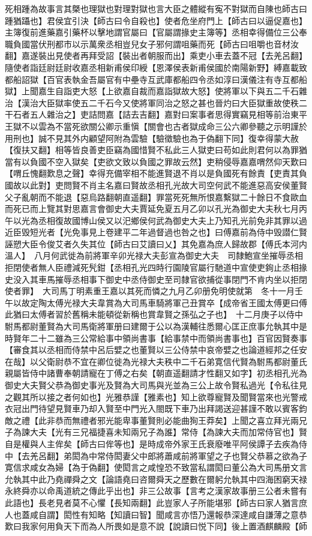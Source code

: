 死相踵為故事言其槩也理獄也對理對獄也言大臣之體縱有寃不對獄而自陳也師古曰踵猶躡也】君侯宜引決【師古曰令自殺也】使者危坐府門上【師古曰以逼促嘉也】主簿復前進藥嘉引藥杯以擊地謂官屬曰【官屬謂掾史主簿等】丞相幸得備位三公奉職負國當伏刑都市以示萬衆丞相豈兒女子邪何謂咀藥而死【師古曰咀嚼也音材汝翻】嘉遂裝出見使者再拜受詔【裝出者朝服而出】乘吏小車去蓋不冠【去羌呂翻】隨使者詣廷尉廷尉收嘉丞相新甫侯印綬【恩澤侯表新甫侯國於南陽新野】縛嘉載致都船詔獄【百官表執金吾屬官有中壘寺互武庫都船四令丞如淳曰漢儀注有寺互都船獄】上聞嘉生自詣吏大怒【上欲嘉自裁而嘉詣獄故大怒】使將軍以下與五二千石雜治【漢治大臣獄率使五二千石今又使將軍同治之怒之甚也晉灼曰大臣獄重故使秩二干石者五人雜治之】吏詰問嘉【詰去吉翻】嘉對曰案事者思得實竊見相等前治東平王獄不以雲為不當死欲關公卿示重愼【關會也古者獄成命三公六卿參聽之示明謹於用刑也】誠不見其外内顧望阿附為雲驗【驗徵驗也為于偽翻下同】復幸得蒙大赦【復扶又翻】相等皆良善吏臣竊為國惜賢不私此三人獄吏曰苟如此則君何以為罪猶當有以負國不空入獄矣【吏欲文致以負國之罪故云然】吏稍侵辱嘉嘉喟然仰天歎曰【喟丘愧翻歎息之聲】幸得充備宰相不能進賢退不肖以是負國死有餘責【吏責其負國故以此對】吏問賢不肖主名嘉曰賢故丞相孔光故大司空何武不能進惡高安侯董賢父子亂朝而不能退【惡烏路翻朝直遥翻】罪當死死無所恨嘉繫獄二十餘日不食歐血而死已而上覽其對思嘉言會御史大夫賈延免夏五月乙卯以孔光為御史大夫秋七月丙午以光為丞相復故國博山侯又以汜鄉侯何武為御史大夫上乃知孔光前免非其罪以過近臣毁短光者【光免事見上卷建平二年過督過也咎之也】曰傅嘉前為侍中毁譛仁賢誣愬大臣令俊艾者久失其位【師古曰艾讀曰乂】其免嘉為庶人歸故郡【傅氏本河内溫人】　八月何武徙為前將軍辛卯光禄大夫彭宣為御史大夫　司隸鮑宣坐摧辱丞相拒閉使者無人臣禮減死髠鉗【丞相孔光四時行園陵官屬行馳道中宣使吏銁止丞相掾史没入其車馬摧辱丞相事下御史中丞侍御史至司隸官欲捕從事閉門不肯内坐以拒閉使者罪】　大司馬丁明素重王嘉以其死而憐之九月乙卯册免明使就第　冬十一月壬午以故定陶太傅光禄大夫韋賞為大司馬車騎將軍己丑賞卒【成帝省王國太傅更曰傅此猶曰太傅者習於舊稱未能頓從新稱也賞韋賢之孫弘之子也】　十二月庚子以侍中駙馬都尉董賢為大司馬衛將軍册曰建爾于公以為漢輔往悉爾心匡正庶事允執其中是時賢年二十二雖為三公常給事中領尚書事【給事禁中而領尚書事也】百官因賢奏事【審食其以丞相而侍禁中呂后嬖之也董賢以三公侍禁中哀帝嬖之也論道經邦之任安在哉】以父衛尉恭不宜在卿位徙為光禄大夫秩中二千石弟寛信代賢為駙馬都尉董氏親屬皆侍中諸曹奉朝請寵在丁傅之右矣【朝直遥翻請才性翻又如字】初丞相孔光為御史大夫賢父恭為御史事光及賢為大司馬與光並為三公上故令賢私過光【令私往見之觀其所以接之者何如也】光雅恭謹【雅素也】知上欲尊寵賢及聞賢當來也光警戒衣冠出門待望見賢車乃却入賢至中門光入閤既下車乃出拜謁送迎甚謹不敢以賓客鈞敵之禮【此非恭而無禮者邪光能卑事董賢則必能曲狥王莽矣】上聞之喜立拜光兩兄子為諫大夫【光有三兄福捷喜未知兩兄子為誰】常侍【為諫大夫而加常侍官也】賢自是權與人主侔矣【師古曰侔等也】是時成帝外家王氏衰廢唯平阿侯譚子去疾為侍中【去羌呂翻】弟閎為中常侍閎妻父中郎將蕭咸前將軍望之子也賢父恭慕之欲為子寛信求咸女為婦【為于偽翻】使閎言之咸惶恐不致當私謂閎曰董公為大司馬册文言允執其中此乃堯禪舜之文【論語堯曰咨爾舜天之歷數在爾躬允執其中四海困窮天禄永終舜亦以命禹道統之傳此乎出也】非三公故事【言考之漢家故事册三公者未嘗有此語也】長老見者莫不心懼【長知兩翻】此豈家人子所能堪邪【師古曰家人猶言庶人也蓋咸自謂】閎性有知略【知讀曰智】聞咸言亦悟乃還報恭深達咸自謙薄之意恭歎曰我家何用負天下而為人所畏如是意不說【說讀曰悦下同】後上置酒麒麟殿【師